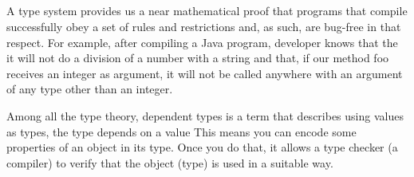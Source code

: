 \documentclass[runningheads,a4paper]{llncs}
\begin{document}
\subsection{}

A type system provides us a near mathematical proof that programs that compile successfully obey a set of rules and restrictions and, as such, are bug-free in that respect. For example, after compiling a Java program, developer knows that the it will not do a division of a number with a string and that, if our method foo receives an integer as argument, it will not be called anywhere with an argument of any type other than an integer.


Among all the type theory,  dependent types is a term that describes using values as types,  the type depends on a value  This means you can encode some properties of an object in its type. Once you do that, it allows a type checker (a compiler) to verify that the object (type) is used in a suitable way.



%
%
%
\end{document}
